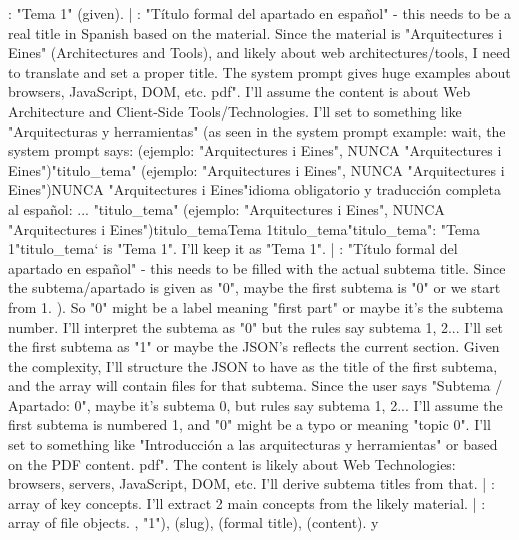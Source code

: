 {  : "Tema 1" (given). |
  : "Título formal del apartado en español" - this needs to be a real title in Spanish based on the material. Since the material is "Arquitectures i Eines" (Architectures and Tools), and likely about web architectures/tools, I need to translate and set a proper title. The system prompt gives huge examples about browsers, JavaScript, DOM, etc. pdf". I'll assume the content is about Web Architecture and Client-Side Tools/Technologies. I'll set  to something like "Arquitecturas y herramientas" (as seen in the system prompt example:  wait, the system prompt says:  (ejemplo: "Arquitectures i Eines", NUNCA "Arquitectures i Eines")"titulo\_tema" (ejemplo: "Arquitectures i Eines", NUNCA "Arquitectures i Eines")NUNCA "Arquitectures i Eines"idioma obligatorio y traducción completa al español: ... "titulo\_tema" (ejemplo: "Arquitectures i Eines", NUNCA "Arquitectures i Eines")titulo\_temaTema 1titulo\_tema"titulo\_tema": "Tema 1"titulo\_tema` is "Tema 1". I'll keep it as "Tema 1". |
  : "Título formal del apartado en español" - this needs to be filled with the actual subtema title. Since the subtema/apartado is given as "0", maybe the first subtema is "0" or we start from 1. ). So "0" might be a label meaning "first part" or maybe it's the subtema number. I'll interpret the subtema as "0" but the rules say subtema 1, 2... I'll set the first subtema as "1" or maybe the JSON's  reflects the current section. Given the complexity, I'll structure the JSON to have  as the title of the first subtema, and the  array will contain files for that subtema. Since the user says "Subtema / Apartado: 0", maybe it's subtema 0, but rules say subtema 1, 2... I'll assume the first subtema is numbered 1, and "0" might be a typo or meaning "topic 0". I'll set  to something like "Introducción a las arquitecturas y herramientas" or based on the PDF content. pdf". The content is likely about Web Technologies: browsers, servers, JavaScript, DOM, etc. I'll derive subtema titles from that. |
  : array of key concepts. I'll extract 2 main concepts from the likely material. |
  : array of file objects. , "1"),  (slug),  (formal title),  (content).
} y 

